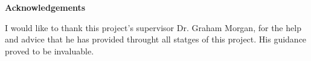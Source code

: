 \thispagestyle{plain}
\begin{center}
  \textbf{Acknowledgements}
\end{center}
I would like to thank this project's supervisor Dr. Graham Morgan, for the help and advice that he has provided throught all statges of this project. His guidance proved to be invaluable.
